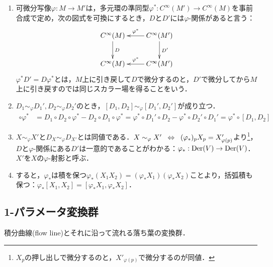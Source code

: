 \documentclass[uplatex,dvipdfmx]{jsreport}
\begin{document}
\begin{definition}\mbox{}
    \begin{enumerate}
        \item 可微分写像$\varphi:M\to M'$は，多元環の準同型$\varphi^*:C^\infty(M')\to C^\infty(M)$を事前合成で定め，次の図式を可換にするとき，$D$と$D'$には$\varphi$-関係があると言う：\[\xymatrix{
            C^\infty(M)\ar[d]^-{D}&C^\infty(M')\ar[l]_-{\varphi^*}\ar[d]^-{D'}\\
            C^\infty(M)&C^\infty(M')\ar[l]_-{\varphi^*}
        }\]
        $\varphi^*D'=D\varphi^*$とは，$M$上に引き戻して$D$で微分するのと，$D'$で微分してから$M$上に引き戻すのでは同じスカラー場を得ることをいう．
        \item $D_1\sim_\varphi D_1',D_2\sim_\varphi D_2'$のとき，$[D_1,D_2]\sim_\varphi [D_1',D_2']$が成り立つ．
        \begin{align*}
            [D_1,D_2]\circ\varphi^*&=D_1\circ D_2\circ\varphi^*-D_2\circ D_1\circ\varphi^*=\varphi^*\circ D_1'\circ D_2-\varphi^*\circ D_2'\circ D_1'=\varphi^*\circ[D_1,D_2]
        \end{align*}
        \item $X\sim_\varphi X'$と$D_X\sim_\varphi D_{X'}$とは同値である．$X\sim_\varphi X'\;\;\Leftrightarrow\;\;(\varphi_*)_pX_p=X'_{\varphi(p)}$より\footnote{$X_p$の押し出しで微分するのと，$X'_{\varphi(p)}$で微分するのが同値．}，$D$と$\varphi$-関係にある$D'$は一意的であることがわかる：$\varphi_*:\mathrm{Der}(V)\to\mathrm{Der}(V)$．$X'$を$X$の$\varphi$-射影と呼ぶ．
        \item すると，$\varphi_*$は積を保つ$\varphi_*(X_1X_2)=(\varphi_*X_1)(\varphi_*X_2)$ことより，括弧積も保つ：$\varphi_*[X_1,X_2]=[\varphi_*X_1,\varphi_*X_2]$．
    \end{enumerate}
\end{definition}

\subsection{1-パラメータ変換群}

\begin{tcolorbox}[colframe=ForestGreen, colback=ForestGreen!10!white,breakable,colbacktitle=ForestGreen!40!white,coltitle=black,fonttitle=\bfseries\sffamily,
title=]
    積分曲線(flow line)とそれに沿って流れる落ち葉の変換群．
\end{tcolorbox}
\end{document}
